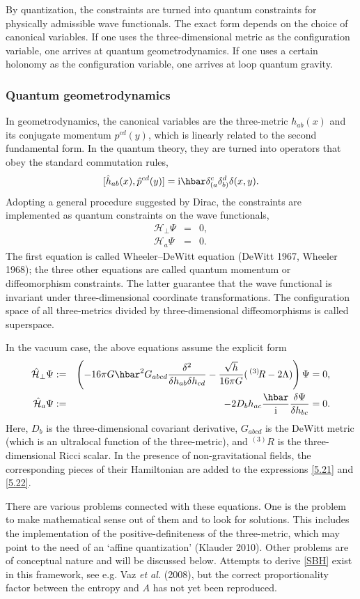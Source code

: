 \documentclass[12pt,a4paper]{article}
\newcommand{\be}{\begin{equation}}
\newcommand{\ee}{\end{equation}}
\newcommand{\bea}{\begin{eqnarray}}
\newcommand{\eea}{\end{eqnarray}}
\newcommand{\lb}{\label}
\newcommand{\I}{{\rm i}}
\begin{document}
By quantization, the constraints are turned into quantum constraints
for physically admissible wave functionals. The exact form depends on
the choice of canonical variables. If one uses the three-dimensional
metric as the configuration variable, one arrives at quantum
geometrodynamics. If one uses a certain holonomy as the configuration
variable, one arrives at loop quantum gravity. 

\subsubsection{Quantum geometrodynamics} 

In geometrodynamics, the canonical variables are the three-metric
${h}_{ab}(x)$ and its conjugate momentum ${p}^{cd}(y)$, which is
linearly related to the second fundamental form. In the quantum
theory, they are turned into operators that obey the standard
commutation rules,
\be
\lb{5.3}
[\hat{h}_{ab}(x),\hat{p}^{cd}(y)]=
\I\hbar\delta^c_{(a}\delta^d_{b)}\delta(x,y).
\ee
Adopting a general procedure suggested by Dirac, the constraints are
implemented as quantum constraints on the wave functionals,
\bea
{\mathcal H}_{\perp} \Psi &=& 0, \lb{5.6} \\ 
{\mathcal H}_a \Psi &=& 0. \lb{5.7}
\eea
The first equation is called Wheeler--DeWitt equation
(DeWitt 1967, Wheeler 1968); the three other
equations are called quantum momentum or diffeomorphism
constraints. The latter guarantee that the wave functional
is invariant under three-di\-men\-sio\-nal coordinate
transformations. The configuration space of all three-metrics divided
by three-dimensional diffeomorphisms is called superspace.

In the vacuum case, the above equations assume the explicit form
\bea
\hat{\mathcal H}_{\perp}\Psi&:=&
\left(-16\pi G\hbar^2G_{abcd}\frac{\delta^2}{\delta h_{ab}\delta h_{cd}}
-\frac{\sqrt{h}}{16\pi G}(\,{}^{(3)}\!R-2\Lambda)\right)\Psi=0, \lb{5.21}\\
\hat{\mathcal H}_a\Psi &:=& -2D_bh_{ac}\frac{\hbar}{\I}
\frac{\delta\Psi}{\delta h_{bc}} =0. \lb{5.22}
\eea
Here, $D_b$ is the three-dimensional covariant derivative,
$G_{abcd}$ is the DeWitt metric (which is an ultralocal function of the
three-metric), and ${}^{(3)}\!R$ is the three-dimensional Ricci
scalar. In the presence of non-gravitational fields, the corresponding
pieces of their Hamiltonian are added to the expressions \eqref{5.21}
and \eqref{5.22}. 

There are various problems connected with these equations. One is the
problem to make mathematical sense out of them and to look for
solutions. This includes the implementation of the
positive-definiteness of the three-metric, which may point to the need
of an `affine quantization' (Klauder 2010).
Other problems are of conceptual nature and will be
discussed below. Attempts to derive \eqref{SBH} exist in this
framework, see e.g. Vaz {\em et al.} (2008), but the correct
proportionality factor between the entropy and $A$ has not yet been
reproduced. 
\end{document}

